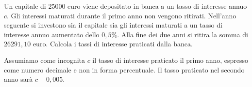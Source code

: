 %  
\begin{problema}
Un capitale di \(25000\) euro viene depositato in banca a un tasso di interesse 
annuo \(c\). Gli interessi maturati durante il primo anno non vengono ritirati.
Nell'anno seguente si investono sia il capitale sia gli interessi maturati a un 
tasso di interesse annuo aumentato dello \(0,5\%\). Alla fine dei due anni si 
ritira
la somma di \(26291,10\) euro. Calcola i tassi di interesse praticati dalla banca.
\end{problema}
Assumiamo come incognita \(c\) il tasso di interesse praticato il primo anno, 
espresso come numero decimale e
non in forma percentuale. Il tasso praticato nel secondo anno sarà \(c+0,005\).


